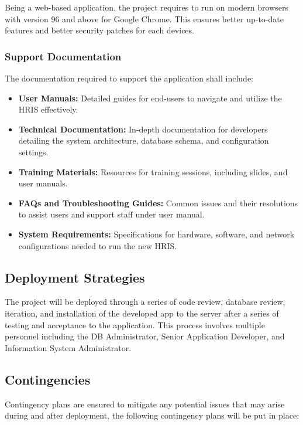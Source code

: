         Being a web-based application, the project requires to run on modern browsers with version 96 and above for Google Chrome. This ensures better up-to-date features and better security patches for each devices.

        \subsubsection{Support Documentation}

        The documentation required to support the application shall include:

        \begin{itemize}
            \item[] \textbf{User Manuals:} Detailed guides for end-users to navigate and utilize the HRIS effectively.
            \item[] \textbf{Technical Documentation:} In-depth documentation for developers detailing the system architecture, database schema, and configuration settings.
            \item[] \textbf{Training Materials:} Resources for training sessions, including slides, and user manuals.
            \item[] \textbf{FAQs and Troubleshooting Guides:} Common issues and their resolutions to assist users and support staff under user manual.
            \item[] \textbf{System Requirements:} Specifications for hardware, software, and network configurations needed to run the new HRIS.
        \end{itemize}

    \subsection{Deployment Strategies}
    
    The project will be deployed through a series of code review, database review, iteration, and installation of the developed app to the server after a series of testing and acceptance to the application. This process involves multiple personnel including the DB Administrator, Senior Application Developer, and Information System Administrator. 
    
    \subsection{Contingencies}
    
    Contingency plans are ensured to mitigate any potential issues that may arise during and after deployment, the following contingency plans will be put in place:

